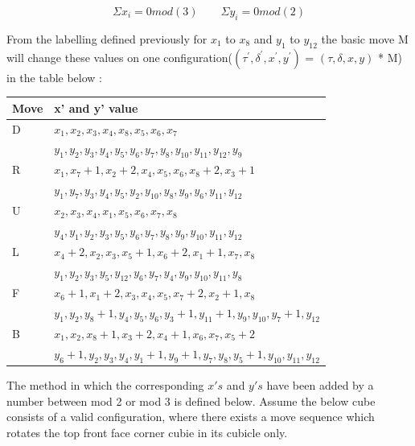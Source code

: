 \documentclass{article}
\begin{document}
\begin{equation}
\Sigma x_{i} =0mod(3) \qquad \Sigma y_{i} =0mod(2) 
\end{equation}

From the labelling defined previously for $x_{1}$ to $x_{8}$ and $y_{1}$ to $y_{12}$ the basic move M will change these values on one configuration($(\tau^{'} ,\delta^{'} , x^{'} , y^{'} )$ = $(\tau,\delta, x, y)$ * M) in the table below \cite{chengroup}:

\begin{center}
\label{:paritytable}
    \begin{tabular}{ | l | p{12cm} |}
    \hline
    Move & x' and y' value \\ \hline
    D &  $x_1,x_2,x_3,x_4,x_8,x_5,x_6,x_7$ \\
& $y_1,y_2,y_3,y_4,y_5,y_6,y_7,y_8,y_{10},y_{11},y_{12},y_9$\\ \hline
    R &  $x_1,x_7 +1,x_2 +2,x_4,x_5,x_6,x_8 +2,x_3 +1$\\ & $y_1,y_7,y_3,y_4,y_5,y_2,y_{10},y_{8},y_{9},y_{6},y_{11},y_{12}$\\ \hline
    U &  $x_2,x_3,x_4,x_1,x_5,x_6,x_7,x_8$ \\ & $y_4,y_1,y_2,y_3,y_5,y_6,y_{7},y_{8},y_{9},y_{10},y_{11},y_{12}$\\ \hline
    L & $x_4 +2,x_2,x_3,x_5 + 1,x_6 +2,x_1 + 1,x_7,x_8$ \\
& $y_1,y_2,y_3,y_5,y_12,y_6,y_{7},y_{4},y_{9},y_{10},y_{11},y_{8}$\\ \hline
    F &  $x_6 +1,x_1 +2,x_3,x_4,x_5,x_7 +2,x_2 +1,x_8$\\
& $y_1,y_2,y_8 +1,y_4,y_5,y_6,y_{3}+1,y_{11}+1,y_{9},y_{10},y_{7}+1,y_{12}$\\ \hline
    B &  $x_1,x_2,x_8 +1,x_3 + 2,x_4 + 1,x_6,x_7,x_5 +2$ \\
&$y_6 +1,y_2,y_3,y_4,y_1 +1,y_9 +1,y_{7},y_{8},y_{5}+1,y_{10},y_{11},y_{12}$\\ \hline
    \end{tabular}
\end{center}
The method in which the corresponding $x's$ and $y's$ have been added by a number between mod 2 or mod 3 is defined below. Assume the below cube consists of a valid configuration, where there exists a move sequence which rotates the top front face corner cubie in its cubicle only. 
\end{document}
